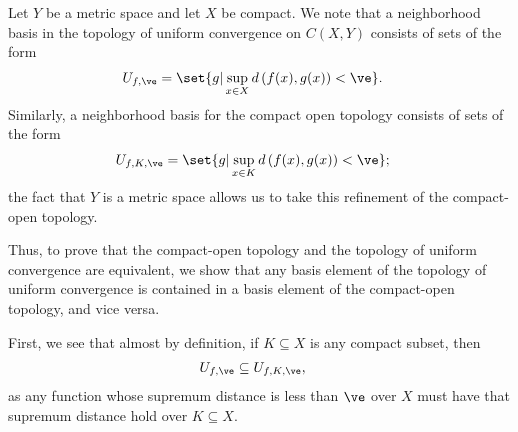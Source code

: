 \documentclass[10pt]{mypackage}
\begin{document}
\begin{solution}
  Let $Y$ be a metric space and let $X$ be compact. We note that a neighborhood basis in the topology of uniform convergence on $C\left( X,Y \right)$ consists of sets of the form
  \begin{align*}
    U_{f,\ve} &= \set{g | \sup_{x\in X}d\left( f(x),g(x) \right) < \ve}.
  \end{align*}
  Similarly, a neighborhood basis for the compact open topology consists of sets of the form
  \begin{align*}
    U_{f,K,\ve} &= \set{g | \sup_{x\in K}d\left( f(x),g(x) \right) < \ve};
  \end{align*}
  the fact that $Y$ is a metric space allows us to take this refinement of the compact-open topology.\newline

  Thus, to prove that the compact-open topology and the topology of uniform convergence are equivalent, we show that any basis element of the topology of uniform convergence is contained in a basis element of the compact-open topology, and vice versa.\newline

  First, we see that almost by definition, if $K\subseteq X$ is any compact subset, then
  \begin{align*}
    U_{f,\ve} &\subseteq U_{f,K,\ve},
  \end{align*}
  as any function whose supremum distance is less than $\ve$ over $X$ must have that supremum distance hold over $K\subseteq X$.\newline


\end{solution}
\end{document}
